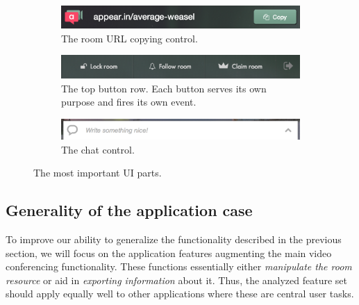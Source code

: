 \begin{figure}[t]
  \centering
  \begin{subfigure}[t]{0.8\textwidth}
    \includegraphics[width=\textwidth]{Figures/screenshots/appearin/feature-copy}
    \caption{The room URL copying control.}
    \label{fig:ui:copy_control}
  \end{subfigure}

  \vspace{.5cm}

  \begin{subfigure}[t]{0.95\textwidth}
    \includegraphics[width=\textwidth]{Figures/screenshots/appearin/feature-buttons-top}
    \caption{The top button row. Each button serves its own purpose and fires its own event.}
    \label{fig:ui:top_buttons}
  \end{subfigure}

  \vspace{.5cm}

  \begin{subfigure}[t]{0.95\textwidth}
    \includegraphics[width=\textwidth]{Figures/screenshots/appearin/feature-chat}
    \caption{The chat control.}
    \label{fig:ui:chat}
  \end{subfigure}

  \caption{The most important UI parts.}
  \label{fig:important_ui_parts}
\end{figure}

\subsection{Generality of the application case}
\label{survey:sub:generality}

To improve our ability to generalize the functionality described in the previous section, we will focus on the application features augmenting the main video conferencing functionality. These functions essentially either \emph{manipulate the room resource} or aid in \emph{exporting information} about it. Thus, the analyzed feature set should apply equally well to other applications where these are central user tasks.

